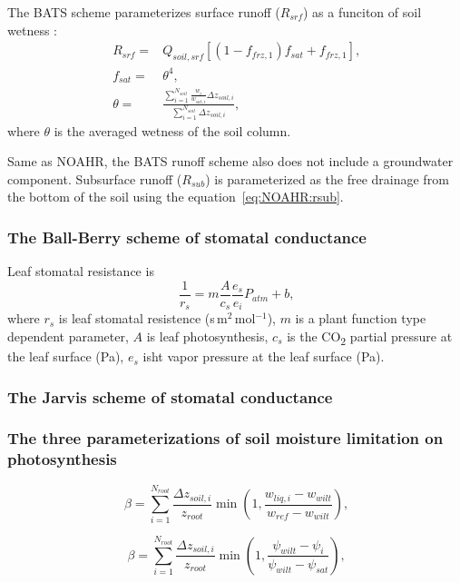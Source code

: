 \documentclass[essd]{copernicus}
\begin{document}
The BATS scheme parameterizes surface runoff (\(R_{srf}\)) as a funciton of soil
wetness \citep{yang1996GPC}:
\begin{align}
    R_{srf} = & Q_{soil,srf} \left[ (1 - f_{frz,1}) f_{sat} + f_{frz,1} \right]
    \text{,} \\
    f_{sat} = & \theta^4 \text{,} \\
    \theta =  & \frac{\sum_{i=1}^{N_{soil}}\frac{w_i}{w_{sat,i}}\Delta
    z_{soil,i}}{\sum_{i=1}^{N_{soil}}\Delta z_{soil,i}} \text{,}
\end{align}
where \(\theta\) is the averaged wetness of the soil column.

Same as NOAHR, the BATS runoff scheme also does not include a groundwater
component. Subsurface runoff (\(R_{sub}\)) is parameterized as the free drainage
from the bottom of the soil using the equation~\eqref{eq:NOAHR:rsub}.


\subsubsection{The Ball-Berry scheme of stomatal conductance}

Leaf stomatal resistance is
\begin{equation}
    \frac{1}{r_s} = m\frac{A}{c_s}\frac{e_s}{e_i}P_{atm}+b \text{,}
\end{equation}
where \(r_s\) is leaf stomatal resistence (s\,m$^2$\,mol$^{-1}$), \(m\) is a
plant function type dependent parameter, \(A\) is leaf photosynthesis, \(c_s\)
is the CO\textsubscript{2} partial pressure at the leaf surface (Pa), \(e_s\)
isht vapor pressure at the leaf surface (Pa).


\subsubsection{The Jarvis scheme of stomatal conductance}

\subsubsection{The three parameterizations of soil moisture limitation on
    photosynthesis}

\begin{equation}
    \beta = \sum_{i=1}^{N_{root}} \frac{\Delta z_{soil,i}}{z_{root}}
    \min\left(1, \frac{w_{liq,i} - w_{wilt}}{w_{ref} - w_{wilt}}\right)
    \text{,}
\end{equation}

\begin{equation}
    \beta = \sum_{i=1}^{N_{root}} \frac{\Delta z_{soil,i}}{z_{root}}
    \min\left(1, \frac{\psi_{wilt} - \psi_{i}}{\psi_{wilt} - \psi_{sat}}\right)
    \text{,}
\end{equation}
\end{document}
